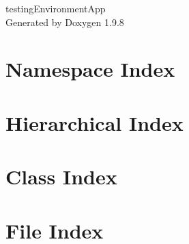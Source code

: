 \documentclass[twoside]{book}
\newcommand{\+}{\discretionary{\mbox{\scriptsize$\hookleftarrow$}}{}{}}
\newcommand{\clearemptydoublepage}{%
    \newpage{\pagestyle{empty}\cleardoublepage}%
  }
\begin{document}
  \raggedbottom
    \hypersetup{pageanchor=false,
                bookmarksnumbered=true,
                pdfencoding=unicode
               }
  \begin{titlepage}
  \vspace*{7cm}
  \begin{center}%
  {\Large testing\+Environment\+App}\\
  \vspace*{1cm}
  {\large Generated by Doxygen 1.9.8}\\
  \end{center}
  \end{titlepage}
  \clearemptydoublepage
  \tableofcontents
  \clearemptydoublepage
  \hypersetup{pageanchor=true}
\chapter{Namespace Index}

\chapter{Hierarchical Index}

\chapter{Class Index}

\chapter{File Index}

\end{document}
